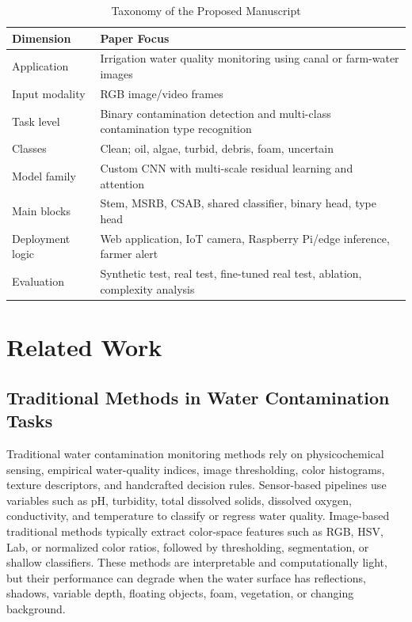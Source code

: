\documentclass[journal]{IEEEtran}
\newcommand{\msrb}{MSRB}
\newcommand{\csab}{CSAB}
\begin{document}
\begin{table}[!t]
\centering
\caption{Taxonomy of the Proposed Manuscript}
\label{tab:paper_taxonomy}
\begin{tabularx}{\linewidth}{lX}
\toprule
\textbf{Dimension} & \textbf{Paper Focus} \\
\midrule
Application & Irrigation water quality monitoring using canal or farm-water images \\
Input modality & RGB image/video frames \\
Task level & Binary contamination detection and multi-class contamination type recognition \\
Classes & Clean; oil, algae, turbid, debris, foam, uncertain \\
Model family & Custom CNN with multi-scale residual learning and attention \\
Main blocks & Stem, \msrb{}, \csab{}, shared classifier, binary head, type head \\
Deployment logic & Web application, IoT camera, Raspberry Pi/edge inference, farmer alert \\
Evaluation & Synthetic test, real test, fine-tuned real test, ablation, complexity analysis \\
\bottomrule
\end{tabularx}
\end{table}

\section{Related Work}
\label{sec:related_work}

\subsection{Traditional Methods in Water Contamination Tasks}
\label{subsec:traditional_methods}
Traditional water contamination monitoring methods rely on physicochemical sensing, empirical water-quality indices, image thresholding, color histograms, texture descriptors, and handcrafted decision rules. Sensor-based pipelines use variables such as pH, turbidity, total dissolved solids, dissolved oxygen, conductivity, and temperature to classify or regress water quality. Image-based traditional methods typically extract color-space features such as RGB, HSV, Lab, or normalized color ratios, followed by thresholding, segmentation, or shallow classifiers. These methods are interpretable and computationally light, but their performance can degrade when the water surface has reflections, shadows, variable depth, floating objects, foam, vegetation, or changing background.
\end{document}
